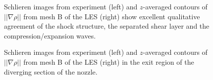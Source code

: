 \documentclass[]{aiaa-tc}%
\begin{document}

\begin{figure}[!h]%
	\begin{center}
	\end{center}
 	\caption{Schlieren images from experiment \cite{Papam:10} (left) and $z$-averaged contours of $||\nabla\rho||$ from mesh B of the LES (right) show excellent qualitative agreement of the shock structure, the separated shear layer and the compression/expansion waves.  }
 	\label{fig:schl}
\end{figure}


\begin{figure}[!h]%
	\begin{center}
	\end{center}
 	\caption{Schlieren images from experiment \cite{Papam:10} (left) and $z$-averaged contours of $||\nabla\rho||$ from mesh B of the LES (right) in the exit region of the diverging section of the nozzle.  }
 	\label{fig:schl_ex}
\end{figure}
\end{document}
